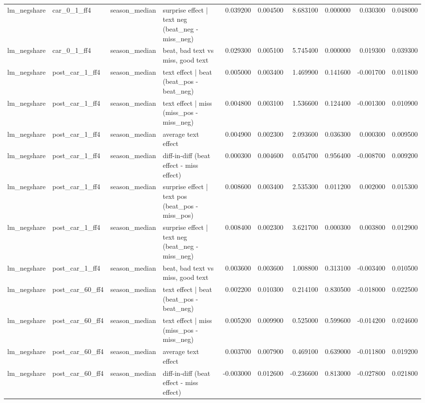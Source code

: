 \begin{table}
\begin{tabular}{llllrrrrrr}
lm\_negshare & car\_0\_1\_ff4 & season\_median & surprise effect | text neg (beat\_neg - miss\_neg) & 0.039200 & 0.004500 & 8.683100 & 0.000000 & 0.030300 & 0.048000 \\
lm\_negshare & car\_0\_1\_ff4 & season\_median & beat, bad text vs miss, good text & 0.029300 & 0.005100 & 5.745400 & 0.000000 & 0.019300 & 0.039300 \\
lm\_negshare & post\_car\_1\_ff4 & season\_median & text effect | beat  (beat\_pos - beat\_neg) & 0.005000 & 0.003400 & 1.469900 & 0.141600 & -0.001700 & 0.011800 \\
lm\_negshare & post\_car\_1\_ff4 & season\_median & text effect | miss  (miss\_pos - miss\_neg) & 0.004800 & 0.003100 & 1.536600 & 0.124400 & -0.001300 & 0.010900 \\
lm\_negshare & post\_car\_1\_ff4 & season\_median & average text effect & 0.004900 & 0.002300 & 2.093600 & 0.036300 & 0.000300 & 0.009500 \\
lm\_negshare & post\_car\_1\_ff4 & season\_median & diff-in-diff (beat effect - miss effect) & 0.000300 & 0.004600 & 0.054700 & 0.956400 & -0.008700 & 0.009200 \\
lm\_negshare & post\_car\_1\_ff4 & season\_median & surprise effect | text pos (beat\_pos - miss\_pos) & 0.008600 & 0.003400 & 2.535300 & 0.011200 & 0.002000 & 0.015300 \\
lm\_negshare & post\_car\_1\_ff4 & season\_median & surprise effect | text neg (beat\_neg - miss\_neg) & 0.008400 & 0.002300 & 3.621700 & 0.000300 & 0.003800 & 0.012900 \\
lm\_negshare & post\_car\_1\_ff4 & season\_median & beat, bad text vs miss, good text & 0.003600 & 0.003600 & 1.008800 & 0.313100 & -0.003400 & 0.010500 \\
lm\_negshare & post\_car\_60\_ff4 & season\_median & text effect | beat  (beat\_pos - beat\_neg) & 0.002200 & 0.010300 & 0.214100 & 0.830500 & -0.018000 & 0.022500 \\
lm\_negshare & post\_car\_60\_ff4 & season\_median & text effect | miss  (miss\_pos - miss\_neg) & 0.005200 & 0.009900 & 0.525000 & 0.599600 & -0.014200 & 0.024600 \\
lm\_negshare & post\_car\_60\_ff4 & season\_median & average text effect & 0.003700 & 0.007900 & 0.469100 & 0.639000 & -0.011800 & 0.019200 \\
lm\_negshare & post\_car\_60\_ff4 & season\_median & diff-in-diff (beat effect - miss effect) & -0.003000 & 0.012600 & -0.236600 & 0.813000 & -0.027800 & 0.021800 \\

\end{tabular}
\end{table}
